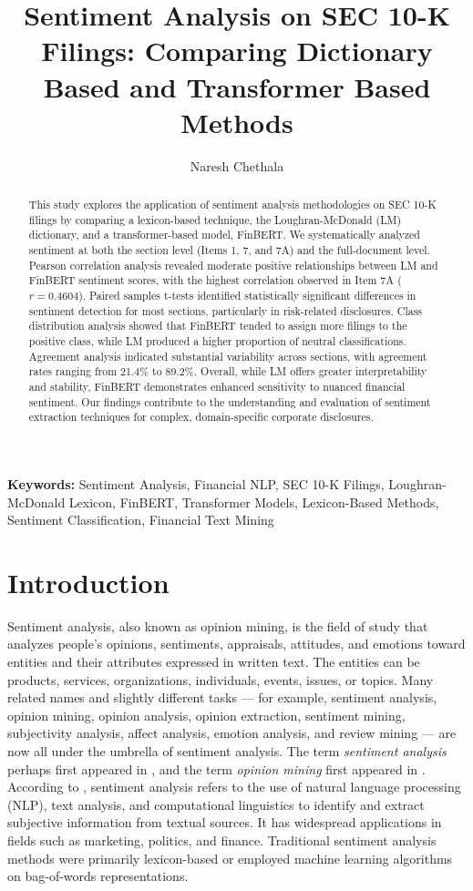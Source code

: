 \documentclass[12pt]{article}
\title{Sentiment Analysis on SEC 10-K Filings: \newline Comparing Dictionary Based and Transformer Based Methods}
\author{Naresh Chethala}
\date{}
\begin{document}
\maketitle

\begin{abstract}
This study explores the application of sentiment analysis methodologies on SEC 10-K filings by comparing a lexicon-based technique, the Loughran-McDonald (LM) dictionary, and a transformer-based model, FinBERT. We systematically analyzed sentiment at both the section level (Items 1, 7, and 7A) and the full-document level. Pearson correlation analysis revealed moderate positive relationships between LM and FinBERT sentiment scores, with the highest correlation observed in Item 7A ($r=0.4604$). Paired samples t-tests identified statistically significant differences in sentiment detection for most sections, particularly in risk-related disclosures. Class distribution analysis showed that FinBERT tended to assign more filings to the positive class, while LM produced a higher proportion of neutral classifications. Agreement analysis indicated substantial variability across sections, with agreement rates ranging from 21.4\% to 89.2\%. Overall, while LM offers greater interpretability and stability, FinBERT demonstrates enhanced sensitivity to nuanced financial sentiment. Our findings contribute to the understanding and evaluation of sentiment extraction techniques for complex, domain-specific corporate disclosures.
\end{abstract}

\textbf{Keywords:} Sentiment Analysis, Financial NLP, SEC 10-K Filings, Loughran-McDonald Lexicon, FinBERT, Transformer Models, Lexicon-Based Methods, Sentiment Classification, Financial Text Mining
\section{Introduction}
Sentiment analysis, also known as opinion mining, is the field of study that analyzes people's opinions, sentiments, appraisals, attitudes, and emotions toward entities and their attributes expressed in written text. The entities can be products, services, organizations, individuals, events, issues, or topics. Many related names and slightly different tasks — for example, sentiment analysis, opinion mining, opinion analysis, opinion extraction, sentiment mining, subjectivity analysis, affect analysis, emotion analysis, and review mining — are now all under the umbrella of sentiment analysis. The term \textit{sentiment analysis} perhaps first appeared in \citep{Nasukawa2003}, and the term \textit{opinion mining} first appeared in \citep{Dave2003}. According to \citet{Pang2008}, sentiment analysis refers to the use of natural language processing (NLP), text analysis, and computational linguistics to identify and extract subjective information from textual sources. It has widespread applications in fields such as marketing, politics, and finance. Traditional sentiment analysis methods were primarily lexicon-based or employed machine learning algorithms on bag-of-words representations.
\end{document}
